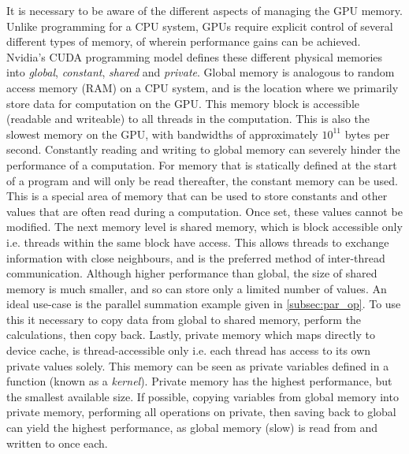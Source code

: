 It is necessary to be aware of the different aspects of managing the GPU memory. Unlike programming for a CPU system, GPUs require explicit control of several different types of memory, of wherein performance gains can be achieved. Nvidia's CUDA programming model defines these different physical memories into \textit{global}, \textit{constant}, \textit{shared} and \textit{private}. Global memory is analogous to random access memory (RAM) on a CPU system, and is the location where we primarily store data for computation on the GPU. This memory block is accessible (readable and writeable) to all threads in the computation. This is also the slowest memory on the GPU, with bandwidths of approximately $10^{11}$ bytes per second. Constantly reading and writing to global memory can severely hinder the performance of a computation. For memory that is statically defined at the start of a program and will only be read thereafter, the constant memory can be used. This is a special area of memory that can be used to store constants and other values that are often read during a computation. Once set, these values cannot be modified. The next memory level is shared memory, which is block accessible only i.e. threads within the same block have access. This allows threads to exchange information with close neighbours, and is the preferred method of inter-thread communication. Although higher performance than global, the size of shared memory is much smaller, and so can store only a limited number of values. An ideal use-case is the parallel summation example given in \ref{subsec:par_op}. To use this it necessary to copy data from global to shared memory, perform the calculations, then copy back. Lastly, private memory which maps directly to device cache, is thread-accessible only i.e. each thread has access to its own private values solely. This memory can be seen as private variables defined in a function (known as a \textit{kernel}). Private memory has the highest performance, but the smallest available size. If possible, copying variables from global memory into private memory, performing all operations on private, then saving back to global can yield the highest performance, as global memory (slow) is read from and written to once each.

